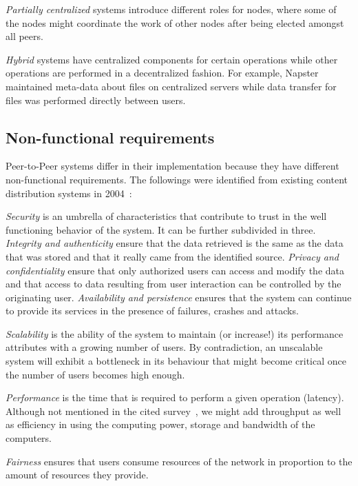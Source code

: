 \textit{Partially centralized} systems introduce different roles for nodes, where some of the nodes might coordinate the work of other nodes after being elected amongst all peers.

\textit{Hybrid} systems have centralized components for certain operations while other operations are performed in a decentralized fashion. For example, Napster maintained meta-data about files on centralized servers while data transfer for files was performed directly between users.

\subsection{Non-functional requirements}
\label{sec:NonFunctionalProperties}

Peer-to-Peer systems differ in their implementation because they have different non-functional requirements. The followings were identified from existing content distribution systems in 2004~\cite{Androutsellis-Theotokis:2004}:

\textit{Security} is an umbrella of characteristics that contribute to trust in the well functioning behavior of the system. It can be further subdivided in three. \textit{Integrity and authenticity} ensure that the data retrieved is the same as the data that was stored and that it really came from the identified source. \textit{Privacy and confidentiality} ensure that only authorized users can access and modify the data and that access to data resulting from user interaction can be controlled by the originating user. \textit{Availability and persistence} ensures that the system can continue to provide its services in the presence of failures, crashes and attacks.
 
\textit{Scalability} is the ability of the system to maintain (or increase!) its performance attributes with a growing number of users. By contradiction, an unscalable system will exhibit a bottleneck in its behaviour that might become critical once the number of users becomes high enough.

\textit{Performance} is the time that is required to perform a given operation (latency). Although not mentioned in the cited survey~\cite{Androutsellis-Theotokis:2004}, we might add throughput as well as efficiency in using the computing power, storage and bandwidth of the computers.

\textit{Fairness} ensures that users consume resources of the network in proportion to the amount of resources they provide.

